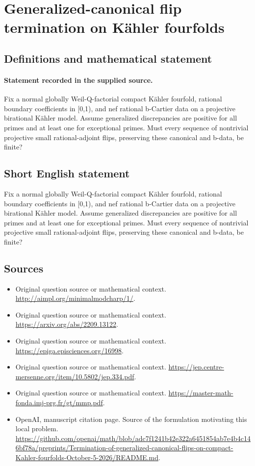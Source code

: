 \documentclass[11pt]{article}
\begin{document}
\section*{Generalized-canonical flip termination on Kähler fourfolds}\label{statement}
\subsection{Definitions and mathematical statement}
\paragraph{Statement recorded in the supplied source.}
Fix a normal globally Weil-Q-factorial compact Kähler fourfold, rational boundary coefficients in [0,1), and nef rational b-Cartier data on a projective birational Kähler model. Assume generalized discrepancies are positive for all primes and at least one for exceptional primes. Must every sequence of nontrivial projective small rational-adjoint flips, preserving these canonical and b-data, be finite?
\subsection{Short English statement}
Fix a normal globally Weil-Q-factorial compact Kähler fourfold, rational boundary coefficients in [0,1), and nef rational b-Cartier data on a projective birational Kähler model. Assume generalized discrepancies are positive for all primes and at least one for exceptional primes. Must every sequence of nontrivial projective small rational-adjoint flips, preserving these canonical and b-data, be finite?
\subsection{Sources}
\begin{itemize}
\item[S1] Original question source or mathematical context.
\url{http://aimpl.org/minimalmodcharp/1/}.
\item[S2] Original question source or mathematical context.
\url{https://arxiv.org/abs/2209.13122}.
\item[S3] Original question source or mathematical context.
\url{https://epiga.episciences.org/16998}.
\item[S4] Original question source or mathematical context.
\url{https://jep.centre-mersenne.org/item/10.5802/jep.334.pdf}.
\item[S5] Original question source or mathematical context.
\url{https://master-math-fonda.imj-prg.fr/gt/mmp.pdf}.
\item[S6] OpenAI, manuscript citation page. Source of the formulation motivating this local problem.
\url{https://github.com/openai/math/blob/adc7f1241b42e322a6451854ab7e4b4c146bf78a/preprints/Termination-of-generalized-canonical-flips-on-compact-Kahler-fourfolds-October-5-2026/README.md}.
\end{itemize}
\end{document}
